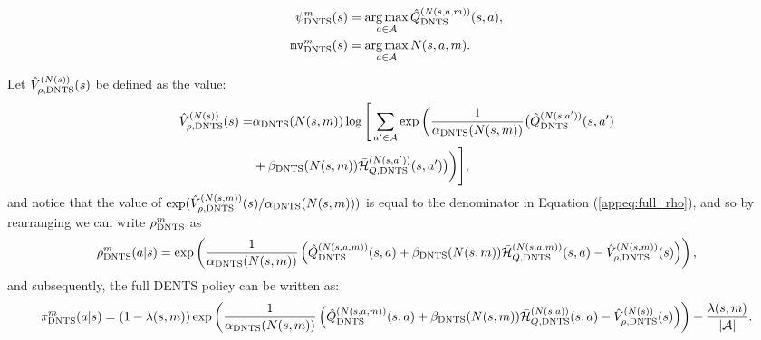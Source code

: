 
        \begin{align}
            {\psi^{m}_{{\textnormal{DNTS}}}}(s) &= \operatorname*{arg\,max}_{a\in\mathcal{A}}{\hat{Q}^{(N(s,a,m))}_{{\textnormal{DNTS}}}}(s,a), \\
            {\textup{\texttt{mv}}^{m}_{{\textnormal{DNTS}}}}(s) &= \operatorname*{arg\,max}_{a\in\mathcal{A}} N(s,a,m).
        \end{align}

         Let ${\hat{V}^{(N(s))}_{\rho,{\textnormal{DNTS}}}}(s)$ be defined as the value:
        \begin{align}
            {\hat{V}^{(N(s))}_{\rho,{\textnormal{DNTS}}}}(s) = &
                {\alpha_{{\textnormal{DNTS}}}}(N(s,m)) \log \Bigg[ \sum_{a'\in\mathcal{A}} \exp\bigg(\frac{1}{{\alpha_{{\textnormal{DNTS}}}}(N(s,m))}
                    \big({\hat{Q}^{(N(s,a'))}_{{\textnormal{DNTS}}}}(s,a') \nonumber \\
                &+ {\beta_{{\textnormal{DNTS}}}}(N(s,m)){\bar{\mathcal{H}}^{(N(s,a'))}_{Q,{\textnormal{DNTS}}}}(s,a') \big)\bigg)\Bigg], \label{appeq:v_rho}
        \end{align} 
        and notice that the value of $\exp({\hat{V}^{(N(s,m))}_{\rho,{\textnormal{DNTS}}}}(s)/{\alpha_{{\textnormal{DNTS}}}}(N(s,m)))$ is equal to the denominator in Equation (\ref{appeq:full_rho}), and so by rearranging we can write ${\rho^{m}_{{\textnormal{DNTS}}}}$ as 
        \begin{align}
            {\rho^{m}_{{\textnormal{DNTS}}}}(a|s) = 
                \exp\left(\frac{1}{{\alpha_{{\textnormal{DNTS}}}}(N(s,m))}\left(
                    {\hat{Q}^{(N(s,a,m))}_{{\textnormal{DNTS}}}}(s,a) 
                    + {\beta_{{\textnormal{DNTS}}}}(N(s,m)){\bar{\mathcal{H}}^{(N(s,a,m))}_{Q,{\textnormal{DNTS}}}}(s,a) 
                    - {\hat{V}^{(N(s,m))}_{\rho,{\textnormal{DNTS}}}}(s) \right)\right), \label{appeq:rho_concise}
        \end{align}
        and subsequently, the full DENTS policy can be written as:
        \begin{align}
            {\pi^{m}_{{\textnormal{DNTS}}}}(a|s) = (1-\lambda(s,m))\exp\left(\frac{1}{{\alpha_{{\textnormal{DNTS}}}}(N(s,m))}\left({\hat{Q}^{(N(s,a,m))}_{{\textnormal{DNTS}}}}(s,a) + {\beta_{{\textnormal{DNTS}}}}(N(s,m)){\bar{\mathcal{H}}^{(N(s,a))}_{Q,{\textnormal{DNTS}}}}(s,a) - {\hat{V}^{(N(s))}_{\rho,{\textnormal{DNTS}}}}(s) \right)\right) + \frac{\lambda(s,m)}{|\mathcal{A}|}. \label{appeq:dents_search_policy_exact} 
        \end{align}








